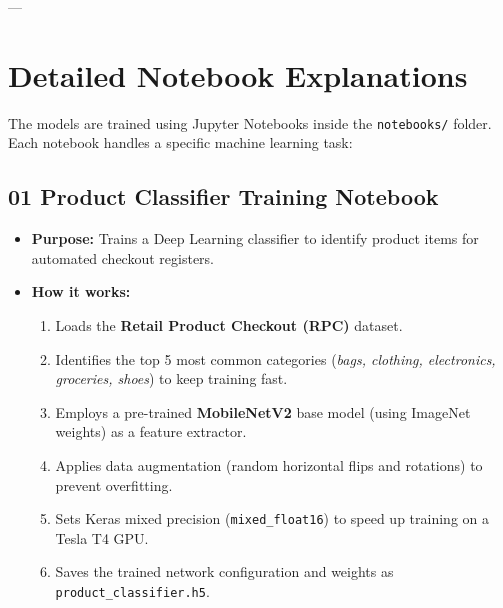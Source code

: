 \documentclass[12pt,a4paper]{article}
\begin{document}
---

\section{Detailed Notebook Explanations}
The models are trained using Jupyter Notebooks inside the \texttt{notebooks/} folder. Each notebook handles a specific machine learning task:

\subsection{01 Product Classifier Training Notebook}
\begin{itemize}
    \item \textbf{Purpose:} Trains a Deep Learning classifier to identify product items for automated checkout registers.
    \item \textbf{How it works:}
        \begin{enumerate}
            \item Loads the \textbf{Retail Product Checkout (RPC)} dataset.
            \item Identifies the top 5 most common categories (\textit{bags, clothing, electronics, groceries, shoes}) to keep training fast.
            \item Employs a pre-trained \textbf{MobileNetV2} base model (using ImageNet weights) as a feature extractor.
            \item Applies data augmentation (random horizontal flips and rotations) to prevent overfitting.
            \item Sets Keras mixed precision (\texttt{mixed\_float16}) to speed up training on a Tesla T4 GPU.
            \item Saves the trained network configuration and weights as \texttt{product\_classifier.h5}.
        \end{enumerate}
\end{itemize}
\end{document}
